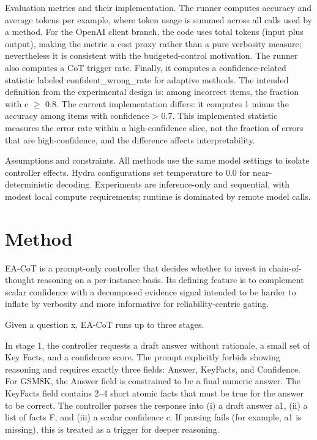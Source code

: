 \documentclass[journal,article,submit,pdftex,moreauthors]{Definitions/mdpi}
\begin{document}
Evaluation metrics and their implementation. The runner computes accuracy and average tokens per example, where token usage is summed across all calls used by a method. For the OpenAI client branch, the code uses total tokens (input plus output), making the metric a cost proxy rather than a pure verbosity measure; nevertheless it is consistent with the budgeted-control motivation. The runner also computes a CoT trigger rate. Finally, it computes a confidence-related statistic labeled confident\_wrong\_rate for adaptive methods. The intended definition from the experimental design is: among incorrect items, the fraction with c $\geq$ 0.8. The current implementation differs: it computes 1 minus the accuracy among items with confidence > 0.7. This implemented statistic measures the error rate within a high-confidence slice, not the fraction of errors that are high-confidence, and the difference affects interpretability.

Assumptions and constraints. All methods use the same model settings to isolate controller effects. Hydra configurations set temperature to 0.0 for near-deterministic decoding. Experiments are inference-only and sequential, with modest local compute requirements; runtime is dominated by remote model calls.

\section{Method}

EA-CoT is a prompt-only controller that decides whether to invest in chain-of-thought reasoning on a per-instance basis. Its defining feature is to complement scalar confidence with a decomposed evidence signal intended to be harder to inflate by verbosity and more informative for reliability-centric gating.

Given a question x, EA-CoT runs up to three stages.

In stage 1, the controller requests a draft answer without rationale, a small set of Key Facts, and a confidence score. The prompt explicitly forbids showing reasoning and requires exactly three fields: Answer, KeyFacts, and Confidence. For GSM8K, the Answer field is constrained to be a final numeric answer. The KeyFacts field contains 2–4 short atomic facts that must be true for the answer to be correct. The controller parses the response into (i) a draft answer a1, (ii) a list of facts F, and (iii) a scalar confidence c. If parsing fails (for example, a1 is missing), this is treated as a trigger for deeper reasoning.
\end{document}
